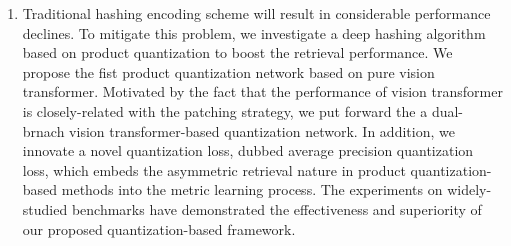 \begin{abstract*}
\begin{enumerate}
  \item Traditional hashing encoding scheme will result in considerable performance declines. To mitigate this problem,  we investigate a deep hashing algorithm based on product quantization to boost the retrieval performance. We propose the fist product quantization network based on pure vision transformer. Motivated by the fact that the performance of vision transformer is closely-related with the patching strategy, we put forward the a dual-brnach vision transformer-based quantization network. In addition, we innovate a novel quantization loss, dubbed average precision quantization loss, which embeds the asymmetric retrieval nature in product quantization-based methods into the metric learning process. The experiments on widely-studied benchmarks have demonstrated the effectiveness and superiority of our proposed quantization-based framework.
\end{enumerate}
\end{abstract*} 

